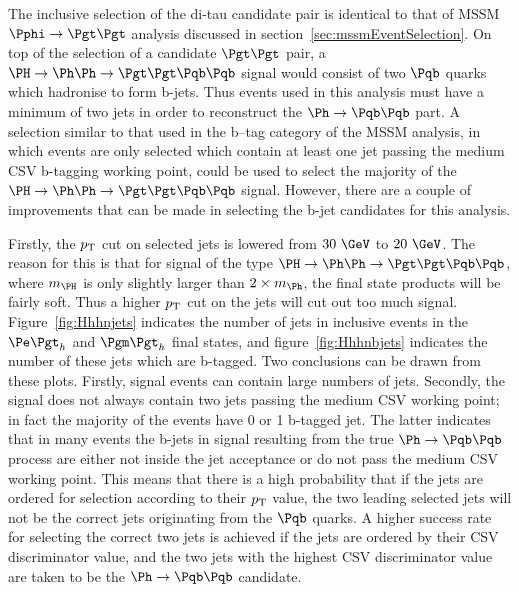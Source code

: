 The inclusive selection of the di-tau candidate pair is identical to that of
\ac{MSSM} $\Pphi\to\Pgt\Pgt$ analysis discussed in
section~\ref{sec:mssmEventSelection}. On top of the selection of a candidate
$\Pgt\Pgt$ pair, a $\PH \to \Ph\Ph \to \Pgt\Pgt \Pqb\Pqb$ signal would consist of two
$\Pqb$ quarks which hadronise to form b-jets. Thus events used in this analysis
must have a minimum of two jets in order to reconstruct the $\Ph\to\Pqb\Pqb$
part. A selection similar to that
used in the b--tag category of the \ac{MSSM} analysis, in which events are only
selected which contain at least one jet passing the medium \ac{CSV} b-tagging working
point, could be used to select the majority of the $\PH \to \Ph\Ph \to \Pgt\Pgt \Pqb\Pqb$
signal. However, there are a couple of improvements that can be made in
selecting the b-jet candidates for this analysis.

Firstly, the $p_{\mathrm{T}}$ cut on selected jets is lowered from
$30~\GeV$ to $20~\GeV$. The reason for this is that for signal of the type
$\PH\to\Ph\Ph\to\Pgt\Pgt\Pqb\Pqb$, where $m_{\PH}$ is only slightly larger than
$2\times m_{\Ph}$, the final state products will be fairly soft. Thus a higher
$p_{\mathrm{T}}$ cut on the jets will cut out too much signal. 
Figure~\ref{fig:Hhhnjets} indicates the number of jets in inclusive
events in the $\etau$ and $\mutau$ final states, and figure~\ref{fig:Hhhnbjets}
indicates the number of these jets which are b-tagged. Two conclusions can be
drawn from these plots. Firstly, signal events can contain large numbers of
jets. Secondly, the signal does not always contain two jets passing the medium
\ac{CSV} working point; in fact the majority of the events have 0 or 1 b-tagged
jet. The latter indicates that in many events the b-jets in signal resulting
from the true $\Ph\to\Pqb\Pqb$ process are either not inside the jet acceptance
or do not pass the medium \ac{CSV} working point. This means that there is a
high probability that if the jets are ordered for selection according to their
$p_{\mathrm{T}}$ value, the two leading selected jets will not be the correct jets
originating from the $\Pqb$ quarks. A higher success rate for selecting the
correct two jets is achieved if the jets are ordered by their \ac{CSV}
discriminator value, and the two jets with the highest \ac{CSV} discriminator
value are taken to be the $\Ph\to\Pqb\Pqb$ candidate.  


